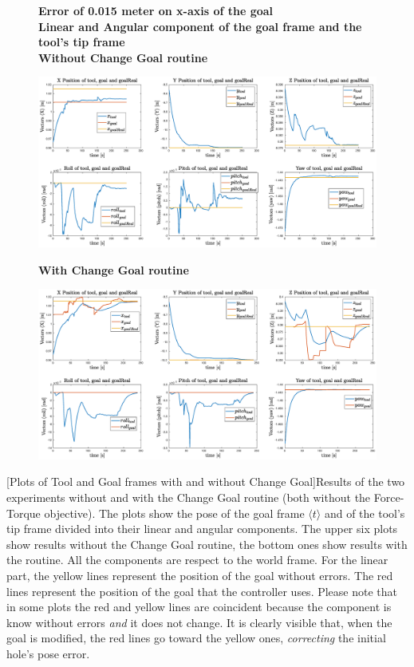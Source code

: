 \begin{figure} [H]
	\centering
	\textbf{Error of 0.015 meter on x-axis of the goal}\\
	\textbf{Linear and Angular component of the goal frame and the tool's tip frame}\\
\vspace{20px}
\textbf{Without Change Goal routine\\}
	\centerline{
		\includegraphics[width=22cm]{error_nothing/6_error.eps}
	}
	\vspace{15px}
\textbf{With Change Goal routine}
	\centerline{
		\includegraphics[width=22cm]{error_goal/6_error.eps}
	}
\end{figure}
\begingroup 
{}[Plots of Tool and Goal frames with and without Change Goal]{Results of the two experiments without and with the Change Goal routine (both without the Force-Torque objective). The plots show the pose of the goal frame $ \langle t \rangle$ and of the tool's tip frame divided into their linear and angular components. The upper six plots show results without the Change Goal routine, the bottom ones show results with the routine. All the components are respect to the world frame. For the linear part, the yellow lines represent the position of the goal without errors. The red lines represent the position of the goal that the controller uses. Please note that in some plots the red and yellow lines are coincident because the component is know without errors \emph{and} it does not change. It is clearly visible that, when the goal is modified, the red lines go toward the yellow ones, \textit{correcting} the initial hole's pose error.}
\label{fig:Error_nothingandgoal_plot6}
\endgroup




